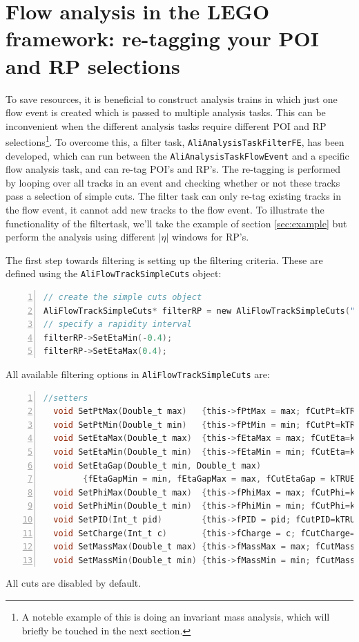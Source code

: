 \documentclass[a4paper]{book}
\numberwithin{equation}{subsection}
\begin{document}
\section{Flow analysis in the LEGO framework: re-tagging your POI and RP selections}
To save resources, it is beneficial to construct analysis trains in which just one flow event is created which is passed to multiple analysis tasks. This can be inconvenient when the different analysis tasks require different POI and RP selections\footnote{A noteble example of this is doing an invariant mass analysis, which will briefly be touched in the next section.}. To overcome this, a filter task, \texttt{AliAnalysisTaskFilterFE}, has been developed, which can run between the \texttt{AliAnalysisTaskFlowEvent} and a specific flow analysis task, and can re-tag POI's and RP's. The re-tagging is performed by looping over all tracks in an event and checking whether or not these tracks pass a selection of simple cuts. The filter task can only re-tag existing tracks in the flow event, it cannot add new tracks to the flow event. To illustrate the functionality of the filtertask, we'll take the example of section \ref{sec:example} but perform the analysis using different $\vert \eta \vert$ windows for RP's.

The first step towards filtering is setting up the filtering criteria. These are defined using the \texttt{AliFlowTrackSimpleCuts} object:
\begin{lstlisting}[language=C, numbers=left]
// create the simple cuts object
AliFlowTrackSimpleCuts* filterRP = new AliFlowTrackSimpleCuts("filterRP"); 
// specify a rapidity interval
filterRP->SetEtaMin(-0.4);
filterRP->SetEtaMax(0.4);\end{lstlisting}

All available filtering options in \texttt{AliFlowTrackSimpleCuts} are: 
\begin{lstlisting}[language=C, numbers=left]
  //setters
  void SetPtMax(Double_t max)   {this->fPtMax = max; fCutPt=kTRUE; }
  void SetPtMin(Double_t min)   {this->fPtMin = min; fCutPt=kTRUE;  }
  void SetEtaMax(Double_t max)  {this->fEtaMax = max; fCutEta=kTRUE; }
  void SetEtaMin(Double_t min)  {this->fEtaMin = min; fCutEta=kTRUE; }
  void SetEtaGap(Double_t min, Double_t max)
        {fEtaGapMin = min, fEtaGapMax = max, fCutEtaGap = kTRUE; }
  void SetPhiMax(Double_t max)  {this->fPhiMax = max; fCutPhi=kTRUE; }
  void SetPhiMin(Double_t min)  {this->fPhiMin = min; fCutPhi=kTRUE; }
  void SetPID(Int_t pid)        {this->fPID = pid; fCutPID=kTRUE; }
  void SetCharge(Int_t c)       {this->fCharge = c; fCutCharge=kTRUE; }
  void SetMassMax(Double_t max) {this->fMassMax = max; fCutMass=kTRUE; }
  void SetMassMin(Double_t min) {this->fMassMin = min; fCutMass=kTRUE; }\end{lstlisting}
All cuts are disabled by default. 
\end{document}
